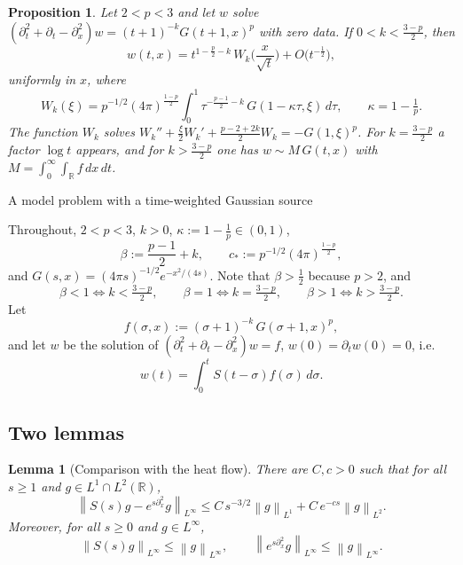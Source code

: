 \documentclass[11pt]{amsart}
\makeatletter
\newtheorem{lemma}{Lemma}[section]
\newtheorem{proposition}{Proposition}[section]
\theoremstyle{definition}
\theoremstyle{remark}
\numberwithin{equation}{section}
\newcommand{\R}{{\mathbb R}}
\newcommand{\pt}{\partial}
\newcommand{\norm}[1]{\left\lVert #1\right\rVert}
\def\section{\@startsection{section}{1}%
  \z@{1.5\linespacing\@plus\linespacing}{.5\linespacing}%
  {\normalfont\bfseries\large\centering}}
\makeatother
\begin{document}
\begin{proposition}\label{prop:k-range}
Let $2<p<3$ and let $w$ solve $(\pt_t^2+\pt_t-\pt_x^2)w=(t+1)^{-k}G(t+1,x)^p$ with zero data.
If $0<k<\frac{3-p}{2}$, then
\[
w(t,x)=t^{1-\frac p2-k}\,W_k\Big(\frac{x}{\sqrt t}\Big)+O\bigl(t^{-\frac12}\bigr),
\]
uniformly in $x$, where
\[
W_k(\xi)=p^{-1/2}(4\pi)^{\frac{1-p}{2}}\int_0^1\tau^{-\frac{p-1}{2}-k}\,G(1-\kappa\tau,\xi)\,d\tau,
\qquad \kappa=1-\tfrac1p .
\]
The function $W_k$ solves
$W_k''+\frac{\xi}{2}W_k'+\frac{p-2+2k}{2}W_k=-G(1,\xi)^p$. For $k=\frac{3-p}{2}$ a factor $\log t$ appears,
and for $k>\frac{3-p}{2}$ one has $w\sim M\,G(t,x)$ with $M=\int_0^\infty\!\int_{\R}f\,dx\,dt$.
\end{proposition}


\section{A model problem with a time-weighted Gaussian source}

Throughout, $2<p<3$, $k>0$, $\kappa:=1-\frac1p\in(0,1)$,
\begin{equation}\label{eq:def-beta-cstar}
\beta:=\frac{p-1}{2}+k,\qquad c_*:=p^{-1/2}(4\pi)^{\frac{1-p}{2}},
\end{equation}
and $G(s,x)=(4\pi s)^{-1/2}e^{-x^2/(4s)}$. Note that $\beta>\frac12$ because $p>2$, and
\begin{equation}\label{eq:beta-vs-k}
\beta<1\iff k<\tfrac{3-p}{2},\qquad \beta=1\iff k=\tfrac{3-p}{2},\qquad \beta>1\iff k>\tfrac{3-p}{2}.
\end{equation}
Let
\[
f(\sigma,x):=(\sigma+1)^{-k}\,G(\sigma+1,x)^p ,
\]
and let $w$ be the solution of $(\pt_t^2+\pt_t-\pt_x^2)w=f$, $w(0)=\pt_tw(0)=0$, i.e.
\begin{equation}\label{eq:w-duhamel}
w(t)=\int_0^tS(t-\sigma)f(\sigma)\,d\sigma .
\end{equation}

\subsection{Two lemmas}

\begin{lemma}[Comparison with the heat flow]\label{lem:heat}
There are $C,c>0$ such that for all $s\ge1$ and $g\in L^1\cap L^2(\R)$,
\begin{equation}\label{eq:S-heat}
\norm{S(s)g-e^{s\pt_x^2}g}_{L^\infty}\le C\,s^{-3/2}\norm{g}_{L^1}+C\,e^{-cs}\norm{g}_{L^2}.
\end{equation}
Moreover, for all $s\ge0$ and $g\in L^\infty$,
\begin{equation}\label{eq:S-contraction}
\norm{S(s)g}_{L^\infty}\le\norm{g}_{L^\infty},\qquad
\norm{e^{s\pt_x^2}g}_{L^\infty}\le\norm{g}_{L^\infty}.
\end{equation}
\end{lemma}
\end{document}
